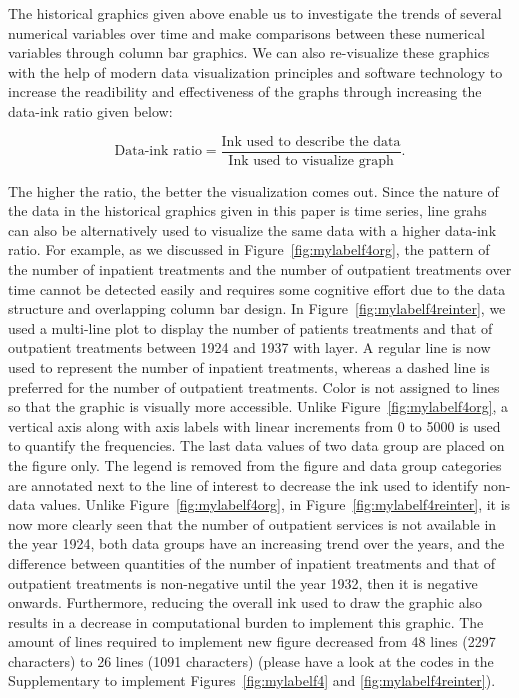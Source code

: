 The historical graphics given above enable us to investigate the trends of several numerical variables over time and make comparisons between these numerical variables  through column bar graphics.
We can also re-visualize these graphics with the help of modern data visualization principles and software technology to increase the readibility and effectiveness of the graphs  through increasing the data-ink ratio given below:

\begin{equation}
\label{key}
\nonumber
\text{Data-ink ratio} = 	\frac{\text{Ink used to describe the data}}{\text{Ink used to visualize graph}} .
\end{equation}

The higher the ratio, the better the visualization comes out. Since the nature of the data in the historical graphics given in this paper is  time series, line grahs can also be alternatively used to visualize the same data with a higher data-ink ratio. For example, as we discussed in Figure~\ref{fig:mylabelf4org}, the pattern of the number of inpatient treatments and the number of outpatient treatments over time cannot be detected easily and requires some cognitive effort due to the data structure and overlapping column bar design. In Figure~\ref{fig:mylabelf4reinter}, we used a multi-line plot to display the number of patients treatments and that of outpatient treatments between 1924 and 1937  with  layer. A regular line is now used to represent the number of inpatient treatments, whereas a dashed line is preferred for the number of outpatient treatments. Color is not assigned to lines so that the graphic is visually more accessible. Unlike Figure~\ref{fig:mylabelf4org}, a vertical axis along with axis labels with linear increments from 0 to 5000 is used to quantify the frequencies. The last data values of two data group are placed on the figure only. The legend is removed from the figure and data group categories are annotated next to the line of interest to decrease the ink used to identify non-data values. Unlike Figure~\ref{fig:mylabelf4org}, in Figure~\ref{fig:mylabelf4reinter}, it is now more clearly seen that the number of outpatient services is not available in the year 1924, both data groups have an increasing trend over the years, and the difference between quantities of the number of inpatient treatments and that of outpatient treatments is non-negative until the year 1932, then it is negative onwards. Furthermore, reducing the overall ink used to draw the graphic also results in a decrease in computational burden to implement this graphic. The amount of lines required to implement new  figure decreased from 48 lines 
(2297 characters) to 26 lines (1091 characters) (please have a look at the  codes  in the Supplementary to implement Figures~\ref{fig:mylabelf4} and \ref{fig:mylabelf4reinter}). 

